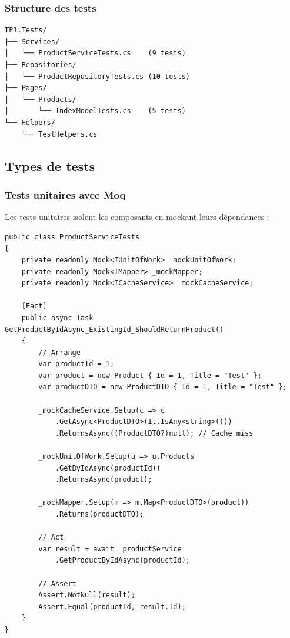 \documentclass[12pt,a4paper]{article}
\begin{document}
\subsubsection{Structure des tests}

\begin{lstlisting}[caption=Structure des tests, float=h!]
TP1.Tests/
├── Services/
│   └── ProductServiceTests.cs    (9 tests)
├── Repositories/
│   └── ProductRepositoryTests.cs (10 tests)
├── Pages/
│   └── Products/
│       └── IndexModelTests.cs    (5 tests)
└── Helpers/
    └── TestHelpers.cs
\end{lstlisting}

\subsection{Types de tests}

\subsubsection{Tests unitaires avec Moq}

Les tests unitaires isolent les composants en mockant leurs dépendances :

\begin{lstlisting}[caption=Exemple de test unitaire, float=h!]
public class ProductServiceTests
{
    private readonly Mock<IUnitOfWork> _mockUnitOfWork;
    private readonly Mock<IMapper> _mockMapper;
    private readonly Mock<ICacheService> _mockCacheService;

    [Fact]
    public async Task GetProductByIdAsync_ExistingId_ShouldReturnProduct()
    {
        // Arrange
        var productId = 1;
        var product = new Product { Id = 1, Title = "Test" };
        var productDTO = new ProductDTO { Id = 1, Title = "Test" };

        _mockCacheService.Setup(c => c
            .GetAsync<ProductDTO>(It.IsAny<string>()))
            .ReturnsAsync((ProductDTO?)null); // Cache miss

        _mockUnitOfWork.Setup(u => u.Products
            .GetByIdAsync(productId))
            .ReturnsAsync(product);

        _mockMapper.Setup(m => m.Map<ProductDTO>(product))
            .Returns(productDTO);

        // Act
        var result = await _productService
            .GetProductByIdAsync(productId);

        // Assert
        Assert.NotNull(result);
        Assert.Equal(productId, result.Id);
    }
}
\end{lstlisting}
\end{document}
